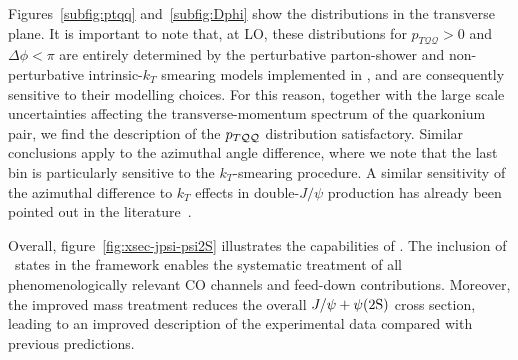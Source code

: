 Figures~\ref{subfig:ptqq} and~\ref{subfig:Dphi} show the distributions in the transverse plane. It is important to note that, at LO, these distributions for $p_{T\mathcal{QQ}}>0$ and $\Delta \phi<\pi$ are entirely determined by the perturbative parton-shower and non-perturbative intrinsic-$k_T$ smearing models implemented in , and are consequently sensitive to their modelling choices. For this reason, together with the large scale uncertainties affecting the transverse-momentum spectrum of the quarkonium pair, we find the description of the $p_{T{\cal QQ}}$ distribution satisfactory. Similar conclusions apply to the azimuthal angle difference, where we note that the last bin is particularly sensitive to the $k_T$-smearing procedure. A similar sensitivity of the azimuthal difference to $k_T$ effects in double-$J/\psi$ production has already been pointed out in the literature~\cite{Kom:2011bd}.

Overall, figure~\ref{fig:xsec-jpsi-psi2S} illustrates the  capabilities of \madsons. The inclusion of \pwavetxt\ states in the framework enables the systematic treatment of all phenomenologically relevant CO channels and feed-down contributions.
Moreover, the improved mass treatment reduces the overall $J/\psi + \psi(2\mathrm{S})$ cross section, leading to an improved description of the experimental data compared with previous predictions.